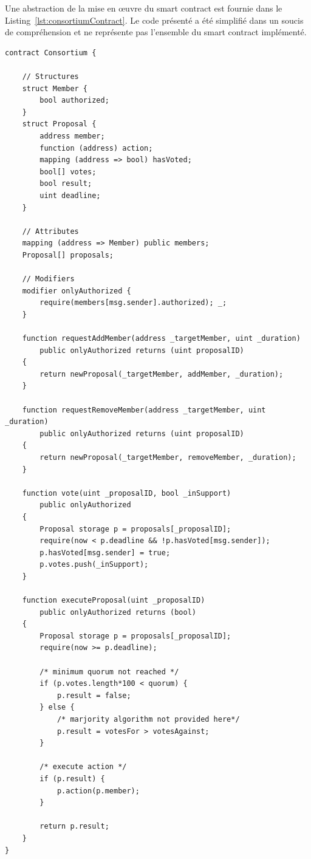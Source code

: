 \documentclass{tnreport}
\begin{document}
Une abstraction de la mise en œuvre du smart contract est fournie dans le Listing~\ref{lst:consortiumContract}. Le code présenté a été simplifié dans un soucis de compréhension et ne représente pas l'ensemble du smart contract implémenté.

\begin{lstlisting}[language=solidity, basicstyle=\small, caption={Consortium Contract}, label={lst:consortiumContract}]
contract Consortium {

	// Structures
	struct Member {
		bool authorized;
	}	
	struct Proposal {
		address member;
		function (address) action;
		mapping (address => bool) hasVoted;
		bool[] votes;
		bool result;
		uint deadline;
	}

	// Attributes
	mapping (address => Member) public members;
	Proposal[] proposals;

	// Modifiers
	modifier onlyAuthorized {
		require(members[msg.sender].authorized); _;
	}

	function requestAddMember(address _targetMember, uint _duration)
		public onlyAuthorized returns (uint proposalID)
	{
		return newProposal(_targetMember, addMember, _duration);
	}

	function requestRemoveMember(address _targetMember, uint _duration)
		public onlyAuthorized returns (uint proposalID)
	{
		return newProposal(_targetMember, removeMember, _duration);
	}

	function vote(uint _proposalID, bool _inSupport)
		public onlyAuthorized
	{
		Proposal storage p = proposals[_proposalID];
		require(now < p.deadline && !p.hasVoted[msg.sender]);
		p.hasVoted[msg.sender] = true;
		p.votes.push(_inSupport);
	}

	function executeProposal(uint _proposalID)
		public onlyAuthorized returns (bool)
	{
		Proposal storage p = proposals[_proposalID];
		require(now >= p.deadline);
		
		/* minimum quorum not reached */
		if (p.votes.length*100 < quorum) { 
			p.result = false;
		} else {		
			/* marjority algorithm not provided here*/
			p.result = votesFor > votesAgainst;
		}

		/* execute action */
		if (p.result) {
			p.action(p.member);
		}
		
		return p.result;
	}
}
\end{lstlisting}
\end{document}
